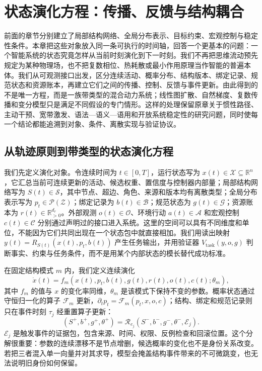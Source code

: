 \chapter{状态演化方程：传播、反馈与结构耦合}
\label{chp:evolution_equation_ch}

前面的章节分别建立了局部结构网络、全局分布表示、目标约束、宏观控制与稳定性条件。本章把这些对象放入同一条可执行的时间轴，回答一个更基本的问题：一个智能系统的状态究竟怎样从当前时刻演化到下一时刻。我们不再把思维流动预先规定为某种物理场，也不把复数相位、热耗散或最小作用原理当作智能的普遍本体。我们从可观测接口出发，区分连续活动、概率分布、结构版本、绑定记录、规范状态和资源账本，再建立它们之间的传播、控制、反馈与事件更新。由此得到的不是唯一方程，而是一族带类型的混合动力系统；线性图扩散、自然梯度、复数传播和变分模型只是满足不同假设的专门情形。这样的处理保留原章关于惯性路径、主动干预、宽带激发、语法—语义—语用和开放系统稳定性的研究问题，同时使每一个结论都能追溯到对象、条件、离散实现与验证协议。

\section{从轨迹原则到带类型的状态演化方程}
\label{sec:section_2382}

我们先定义演化对象。令连续时间为 $t\in[0,T]$，运行状态写为 $x(t)\in\mathcal X\subseteq\mathbb R^n$，它汇总当前可连续更新的活动、候选权重、置信度与控制器内部量；局部结构网络写为 $S(t)\in\mathcal S$，其中节点、超边、角色、来源和版本均有离散类型；全局分布表示写为 $p_t\in\mathcal P(\mathcal Z)$；绑定记录为 $b(t)\in\mathcal B$；规范状态为 $g(t)\in\mathcal G$；资源账本为 $r(t)\in\mathbb R_{>0}^{d_r}$。外部观测 $o(t)\in\mathcal O$、环境行动 $a(t)\in\mathcal A$ 和宏观控制 $c(t)\in\mathcal C$ 分别通过声明过的接口进入系统。这里的空间可以具有不同维度和单位，不能因为它们共同出现在一个状态包中就直接相加。我们用读出映射 $y(t)=R_{S(t)}(x(t),p_t,b(t))$ 产生任务输出，并用验证器 $V_{\mathrm{task}}(y,o,g)$ 判断事实、约束与任务条件，而不是用某个内部状态的模长替代成功标准。

在固定结构模式 $m$ 内，我们定义连续演化
\begin{equation}
 \dot x(t)=f_m\!\left(x(t),p_t,b(t),g(t),r(t),o(t),c(t);\theta_m\right),
 \label{eq:hsf_general_state}
\end{equation}
其中 $f_m$ 的值与 $x$ 的变化率同维，$\theta_m$ 是该模式下保持不变的参数。概率状态通过守恒归一化的算子 $\mathcal F_m$ 更新，$\partial_t p_t=\mathcal F_m(p_t,x,o,c)$；结构、绑定和规范记录则只在事件时刻 $\tau_j$ 经重置算子更新：
\begin{equation}
 (S^+,b^+,g^+,\theta^+)=\mathcal R_{e_j}(S^-,b^-,g^-,\theta^-,\mathcal E_j).
\end{equation}
$\mathcal E_j$ 是触发事件的证据包，包含来源、时间、权限、反例检查和回滚位置。这个分解很重要：参数的连续漂移不是节点增删，候选概率的变化也不是身份关系改变。若把三者混入单一向量并对其求导，模型会掩盖结构事件带来的不可微跳变，也无法说明旧身份如何保留。

